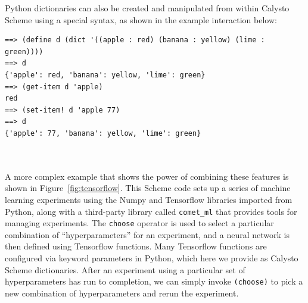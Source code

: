 \documentclass[acmsmall,screen,authorversion]{acmart}
\begin{document}
\noindent
Python dictionaries can also be created and manipulated from within Calysto
Scheme using a special syntax, as shown in the example interaction below:\\

\begin{minipage}{\textwidth}
{\small
\begin{verbatim}
==> (define d (dict '((apple : red) (banana : yellow) (lime : green))))
==> d
{'apple': red, 'banana': yellow, 'lime': green}
==> (get-item d 'apple)
red
==> (set-item! d 'apple 77)
==> d
{'apple': 77, 'banana': yellow, 'lime': green}
\end{verbatim}
}
\end{minipage}


\noindent
\\\\A more complex example that shows the power of combining these features is
shown in Figure~\ref{fig:tensorflow}. This Scheme code sets up a series of
machine learning experiments using the Numpy and Tensorflow libraries imported
from Python, along with a third-party library called \texttt{comet\_ml} that
provides tools for managing experiments.  The \texttt{choose} operator is used
to select a particular combination of ``hyperparameters'' for an experiment,
and a neural network is then defined using Tensorflow functions.  Many
Tensorflow functions are configured via keyword parameters in Python, which
here we provide as Calysto Scheme dictionaries.  After an experiment using a
particular set of hyperparameters has run to completion, we can simply invoke
\texttt{(choose)} to pick a new combination of hyperparameters and rerun the
experiment.

\end{document}
